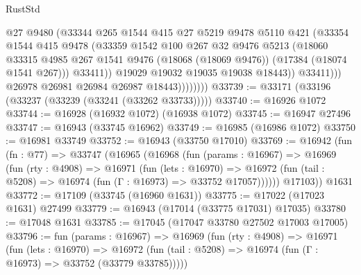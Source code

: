 \begin{lexlean}{RustStd}
\begin{coremodule}
                            @27
                            @9480
                            (@33344
                              @265
                              @1544
                              @415
                              @27
                              @5219
                              @9478
                              @5110
                              @421
                              (@33354
                                @1544
                                @415
                                @9478
                                (@33359
                                  @1542
                                  @100
                                  @267
                                  @32
                                  @9476
                                  @5213
                                  (@18060
                                    @33315
                                    @4985
                                    @267
                                    @1541
                                    @9476
                                    (@18068 (@18069 @9476))
                                    (@17384 (@18074 @1541 @267)))
                                  @33411))
                              @19029
                              @19032
                              @19035
                              @19038
                              @18443))
                          @33411)))
                    @26978
                    @26981
                    @26984
                    @26987
                    @18443))))))))
@33739 := @33171 (@33196 (@33237 (@33239 (@33241 (@33262 @33733)))))
@33740 := @16926 @1072
@33744 := @16928 (@16932 @1072) (@16938 @1072)
@33745 := @16947 @27496
@33747 := @16943 (@33745 @16962)
@33749 := @16985 (@16986 @1072)
@33750 := @16981 @33749
@33752 := @16943 (@33750 @17010)
@33769 := @16942
    (fun (fn : @77) =>
    @33747
      (@16965
        (@16968
          (fun (params : @16967) =>
          @16969
            (fun (rty : @4908) =>
            @16971
              (fun (lets : @16970) =>
              @16972 (fun (tail : @5208) => @16974 (fun (Γ : @16973) => @33752 @17057))))))
        @17103))
    @1631
@33772 := @17109 (@33745 (@16960 @1631))
@33775 := @17022 (@17023 @1631) @27499
@33779 := @16943 (@17014 (@33775 @17031) @17035)
@33780 := @17048 @1631
@33785 := @17045 (@17047 @33780 @27502 @17003 @17005)
@33796 := fun (params : @16967) =>
  @16969
    (fun (rty : @4908) =>
    @16971
      (fun (lets : @16970) =>
      @16972 (fun (tail : @5208) => @16974 (fun (Γ : @16973) => @33752 (@33779 @33785)))))

\end{coremodule}
\end{lexlean}
